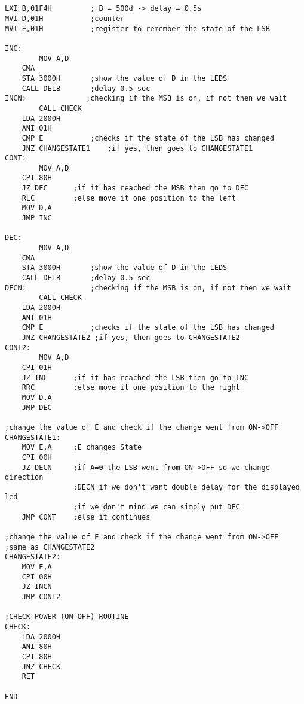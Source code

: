 \documentclass[11pt]{article}
\begin{document}
\begin{verbatim}


LXI B,01F4H 	    ; B = 500d -> delay = 0.5s
MVI D,01H	        ;counter
MVI E,01H	        ;register to remember the state of the LSB 

INC:	
        MOV A,D
	CMA
	STA 3000H	    ;show the value of D in the LEDS
	CALL DELB	    ;delay 0.5 sec
INCN:		       ;checking if the MSB is on, if not then we wait
        CALL CHECK
	LDA 2000H
	ANI 01H
	CMP E		    ;checks if the state of the LSB has changed
	JNZ CHANGESTATE1    ;if yes, then goes to CHANGESTATE1
CONT:	
        MOV A,D
	CPI 80H
	JZ DEC		;if it has reached the MSB then go to DEC
	RLC		    ;else move it one position to the left
	MOV D,A
	JMP INC

DEC:	
        MOV A,D
	CMA
	STA 3000H	    ;show the value of D in the LEDS
	CALL DELB	    ;delay 0.5 sec
DECN:	        	;checking if the MSB is on, if not then we wait
        CALL CHECK
	LDA 2000H
	ANI 01H
	CMP E		    ;checks if the state of the LSB has changed
	JNZ CHANGESTATE2 ;if yes, then goes to CHANGESTATE2
CONT2:	
        MOV A,D
	CPI 01H
	JZ INC		;if it has reached the LSB then go to INC
	RRC		    ;else move it one position to the right
	MOV D,A
	JMP DEC

;change the value of E and check if the change went from ON->OFF 
CHANGESTATE1:	
	MOV E,A	    ;E changes State
	CPI 00H	
	JZ DECN	    ;if A=0 the LSB went from ON->OFF so we change direction
				;DECN if we don't want double delay for the displayed led
				;if we don't mind we can simply put DEC
	JMP CONT	;else it continues

;change the value of E and check if the change went from ON->OFF 
;same as CHANGESTATE2 
CHANGESTATE2:	
	MOV E,A
	CPI 00H
	JZ INCN
	JMP CONT2	

;CHECK POWER (ON-OFF) ROUTINE
CHECK:	
    LDA 2000H
	ANI 80H
	CPI 80H
	JNZ CHECK
	RET

END		

\end{verbatim}
\end{document}
